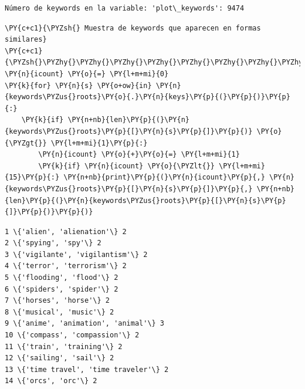     \begin{Verbatim}[commandchars=\\\{\}]
Número de keywords en la variable: 'plot\_keywords': 9474
\end{Verbatim}

    \begin{tcolorbox}[breakable, size=fbox, boxrule=1pt, pad at break*=1mm,colback=cellbackground, colframe=cellborder]
\begin{Verbatim}[commandchars=\\\{\}]
\PY{c+c1}{\PYZsh{} Muestra de keywords que aparecen en formas similares}
\PY{c+c1}{\PYZsh{}\PYZhy{}\PYZhy{}\PYZhy{}\PYZhy{}\PYZhy{}\PYZhy{}\PYZhy{}\PYZhy{}\PYZhy{}\PYZhy{}\PYZhy{}\PYZhy{}\PYZhy{}\PYZhy{}\PYZhy{}\PYZhy{}\PYZhy{}\PYZhy{}\PYZhy{}\PYZhy{}\PYZhy{}\PYZhy{}\PYZhy{}\PYZhy{}\PYZhy{}\PYZhy{}\PYZhy{}\PYZhy{}\PYZhy{}\PYZhy{}\PYZhy{}\PYZhy{}\PYZhy{}\PYZhy{}\PYZhy{}\PYZhy{}\PYZhy{}\PYZhy{}\PYZhy{}\PYZhy{}\PYZhy{}\PYZhy{}\PYZhy{}\PYZhy{}\PYZhy{}\PYZhy{}\PYZhy{}\PYZhy{}\PYZhy{}\PYZhy{}\PYZhy{}\PYZhy{}\PYZhy{}\PYZhy{}\PYZhy{}\PYZhy{}\PYZhy{}\PYZhy{}\PYZhy{}\PYZhy{}}
\PY{n}{icount} \PY{o}{=} \PY{l+m+mi}{0}
\PY{k}{for} \PY{n}{s} \PY{o+ow}{in} \PY{n}{keywords\PYZus{}roots}\PY{o}{.}\PY{n}{keys}\PY{p}{(}\PY{p}{)}\PY{p}{:}
    \PY{k}{if} \PY{n+nb}{len}\PY{p}{(}\PY{n}{keywords\PYZus{}roots}\PY{p}{[}\PY{n}{s}\PY{p}{]}\PY{p}{)} \PY{o}{\PYZgt{}} \PY{l+m+mi}{1}\PY{p}{:} 
        \PY{n}{icount} \PY{o}{+}\PY{o}{=} \PY{l+m+mi}{1}
        \PY{k}{if} \PY{n}{icount} \PY{o}{\PYZlt{}} \PY{l+m+mi}{15}\PY{p}{:} \PY{n+nb}{print}\PY{p}{(}\PY{n}{icount}\PY{p}{,} \PY{n}{keywords\PYZus{}roots}\PY{p}{[}\PY{n}{s}\PY{p}{]}\PY{p}{,} \PY{n+nb}{len}\PY{p}{(}\PY{n}{keywords\PYZus{}roots}\PY{p}{[}\PY{n}{s}\PY{p}{]}\PY{p}{)}\PY{p}{)}
\end{Verbatim}
\end{tcolorbox}

    \begin{Verbatim}[commandchars=\\\{\}]
1 \{'alien', 'alienation'\} 2
2 \{'spying', 'spy'\} 2
3 \{'vigilante', 'vigilantism'\} 2
4 \{'terror', 'terrorism'\} 2
5 \{'flooding', 'flood'\} 2
6 \{'spiders', 'spider'\} 2
7 \{'horses', 'horse'\} 2
8 \{'musical', 'music'\} 2
9 \{'anime', 'animation', 'animal'\} 3
10 \{'compass', 'compassion'\} 2
11 \{'train', 'training'\} 2
12 \{'sailing', 'sail'\} 2
13 \{'time travel', 'time traveler'\} 2
14 \{'orcs', 'orc'\} 2
\end{Verbatim}

